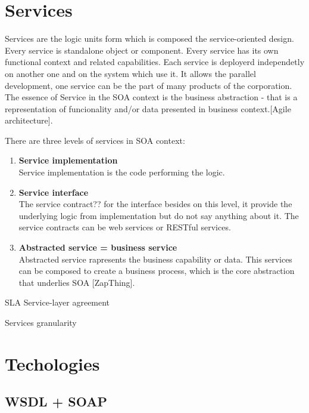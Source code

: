 \section{Services}
\label{sec:services}
Services are the logic units form which is composed the service-oriented design. Every service is standalone object or component. Every service has its own functional context and related capabilities. Each service is deployerd independetly on another one and on the system which use it. It allows the parallel development, one service can be the part of many products of the corporation.
The essence of Service in the SOA context is the business abstraction - that is a representation of funcionality and/or data presented in business context.[Agile architecture].

There are three levels of services in SOA context:
\begin{enumerate}
  \item \textbf{Service implementation} \hfill \\
Service implementation is the code performing the logic.
  \item \textbf{Service interface} \hfill \\ 
The service contract?? for the interface besides on this level, it provide the underlying logic from implementation but do not say anything about it. The service contracts can be web services or RESTful services.
  \item \textbf{Abstracted service = business service} \hfill \\
Abstracted service rapresents the business capability or data. This services can be composed to create a business process, which is the core abstraction that underlies SOA [ZapThing].
\end{enumerate}

SLA Service-layer agreement

Services granularity



\section{Techologies}

\subsection{WSDL + SOAP}
